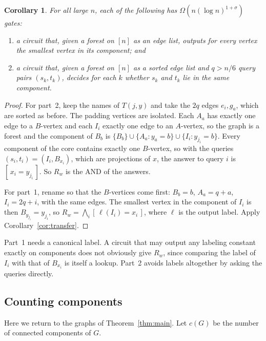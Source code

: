 \documentclass[11pt]{article}
\newtheorem{corollary}[theorem]{Corollary}
\theoremstyle{definition}
\theoremstyle{remark}
\newcommand{\ind}[1]{[\,#1\,]}
\begin{document}
\begin{corollary}\label{cor:forest}
For all large $n$, each of the following has
$\Omega(n(\log n)^{1+\sigma})$ gates:
\begin{enumerate}
\item a circuit that, given a forest on $[n]$ as an edge list, outputs for
every vertex the smallest vertex in its component; and
\item a circuit that, given a forest on $[n]$ as a sorted edge list and
$q>n/6$ query pairs $(s_k,t_k)$, decides for each $k$ whether $s_k$ and
$t_k$ lie in the same component.
\end{enumerate}
\end{corollary}
\begin{proof}
For part~2, keep the names of $T(j,y)$ and take the $2q$ edges $e_i,g_a$,
which are sorted as before. The padding vertices are isolated. Each
$A_a$ has exactly one edge to a $B$-vertex and each $I_i$ exactly one edge
to an $A$-vertex, so the graph is a forest and the component of $B_b$ is
$\{B_b\}\cup\{A_a:y_a=b\}\cup\{I_i:y_{j_i}=b\}$. Every component of the
core contains exactly one $B$-vertex, so with the queries
$(s_i,t_i)=(I_i,B_{x_i})$, which are projections of $x$, the answer to
query $i$ is $\ind{x_i=y_{j_i}}$. So $R_w$ is the AND of the answers.

For part~1, rename so that the $B$-vertices come first: $B_b=b$,
$A_a=q+a$, $I_i=2q+i$, with the same edges. The smallest vertex in the
component of $I_i$ is then $B_{y_{j_i}}=y_{j_i}$, so
$R_w=\bigwedge_i\ind{\ell(I_i)=x_i}$, where $\ell$ is the output label.
Apply Corollary~\ref{cor:transfer}.
\end{proof}

Part~1 needs a canonical label. A circuit that may output any labeling
constant exactly on components does not obviously give $R_w$, since
comparing the label of $I_i$ with that of $B_{x_i}$ is itself a lookup.
Part~2 avoids labels altogether by asking the queries directly.

\subsection{Counting components}

Here we return to the graphs of Theorem~\ref{thm:main}. Let $c(G)$ be the
number of connected components of $G$.
\end{document}
